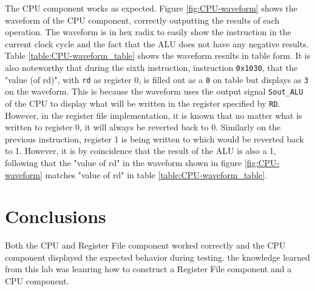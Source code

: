 \documentclass[11pt]{report}
\begin{document}
The CPU component works as expected. Figure \ref{fig:CPU-waveform} shows the waveform of the CPU
component, correctly outputting the results of each operation. The waveform is in hex radix to
easily show the instruction in the current clock cycle and the fact that the ALU does not have any
negative results. Table \ref{table:CPU-waveform_table} shows the waveform results in table form. It
is also noteworthy that during the sixth instruction, instruction \verb|0x1030|, that the "value (of
rd)", with \verb|rd| as register 0, is filled out as a \verb|0| on table but displays as \verb|3| on
the waveform. This is because the waveform uses the output signal \verb|Sout_ALU| of the CPU to
display what will be written in the register specified by \verb|RD|. However, in the register file
implementation, it is known that no matter what is written to register 0, it will always be reverted
back to 0. Similarly on the previous instruction, register 1 is being written to which would be
reverted back to 1. However, it is by coincidence that the result of the ALU is also a 1, following
that the "value of rd" in the waveform shown in figure \ref{fig:CPU-waveform} matches "value of rd"
in table \ref{table:CPU-waveform_table}.

\section*{Conclusions}
Both the CPU and Register File component worked correctly and the CPU component displayed the
expected behavior during testing. the knowledge learned from this lab was leanring how to construct
a Register File component and a CPU component.


% 
% 
% 
% 
% 
% 
\end{document}
